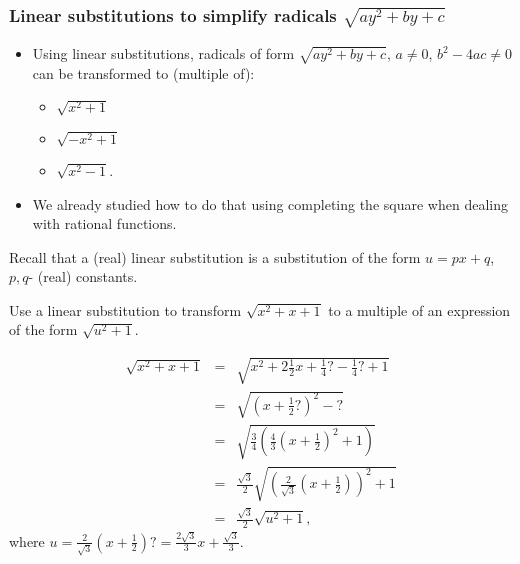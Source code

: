 \begin{frame}
\frametitle{Linear substitutions to simplify radicals $\sqrt{ay^2+by+c}$}
\begin{itemize}
\item Using linear substitutions, radicals of form  $\sqrt{ay^2+by+c}$, $a\neq 0$, $b^2-4ac\neq 0$ can be transformed to (multiple of):
\begin{itemize}
\item $\sqrt{x^2+1}$ 
\item $\sqrt{-x^2+1}$
\item $\sqrt{x^2-1}$.
\end{itemize}
\item We already studied how to do that using completing the square when dealing with rational functions. 
\end{itemize}
\end{frame}
\begin{frame}
Recall that a (real) linear substitution is a substitution of the form $u=px+q$, $p,q$- (real) constants.
\begin{example}
Use a linear substitution to transform $\sqrt{x^2+x+1}$ to a multiple of an expression of the form $\sqrt{u^2+1}$. 

\[
\begin{array}{rcl}
\sqrt{x^2+x+1}&=&\sqrt{ x^2+2\frac{1}{2}x +\frac{1}{4}\textbf{?}-\frac{1}{4}\textbf{?} +1} \\
&=& \sqrt{ \left(x+\frac{1}{2}\textbf{?} \right)^2-\textbf{?} }\\
&=&\sqrt{\frac{3}{4}\left( \frac{4}{3} \left(x+\frac{1}{2}\right)^2+1 \right)}\\
&=&\frac{\sqrt{3}}{2}\sqrt{\left(\frac{2}{\sqrt{3}}\left( x+\frac{1}{2}\right)\right)^2+1}\\
&=& \frac{\sqrt{3}}{2} \sqrt{u^2+1},
\end{array}
\]
where $u=\frac{2}{\sqrt{3}}\left( x+\frac{1}{2}\right) \textbf{?}=\frac{2\sqrt{3}}{3}x+\frac{\sqrt{3}}{3}$.
\end{example}
\vspace{5cm}
\end{frame}
